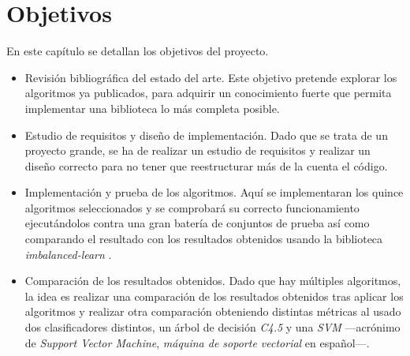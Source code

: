 \chapter{Objetivos} \label{ch:objetivos}

En este capítulo se detallan los objetivos del proyecto.

\begin{itemize}
	\item Revisión bibliográfica del estado del arte. Este objetivo pretende explorar los algoritmos ya publicados, para adquirir un conocimiento fuerte que permita implementar una biblioteca lo más completa posible.
	\item Estudio de requisitos y diseño de implementación. Dado que se trata de un proyecto grande, se ha de realizar un estudio de requisitos y realizar un diseño correcto para no tener que reestructurar más de la cuenta el código. 
	\item Implementación y prueba de los algoritmos. Aquí se implementaran los quince algoritmos seleccionados y se comprobará su correcto funcionamiento ejecutándolos contra una gran batería de conjuntos de prueba así como comparando el resultado con los resultados obtenidos usando la biblioteca \textit{imbalanced-learn} \cite{imbalanced-learn}.
	\item Comparación de los resultados obtenidos. Dado que hay múltiples algoritmos, la idea es realizar una comparación de los resultados obtenidos tras aplicar los algoritmos y realizar otra comparación obteniendo distintas métricas al usado dos clasificadores distintos, un árbol de decisión \textit{C4.5} \cite{c4.5} y una \textit{SVM} \cite{svm} —acrónimo de \textit{Support Vector Machine}, \textit{máquina de soporte vectorial} en español—.
\end{itemize}